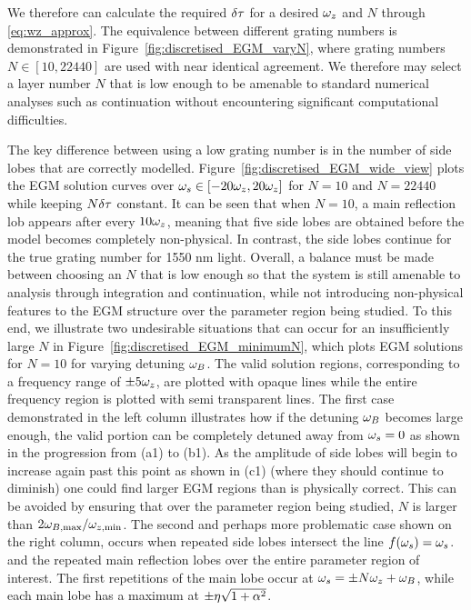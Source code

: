 %
We therefore can calculate the required $\delta \tau$ for a desired $\omega_z$ and $N$ through \eqref{eq:wz_approx}. 
The equivalence between different grating numbers is demonstrated in Figure~\ref{fig:discretised_EGM_varyN}, where grating numbers $N \in [10, 22440]$ are used with near identical agreement. 
We therefore may select a layer number $N$ that is low enough to be amenable to standard numerical analyses such as continuation without encountering significant computational difficulties.
%
\par
%
The key difference between using a low grating number is in the number of side lobes that are correctly modelled. 
Figure~\ref{fig:discretised_EGM_wide_view} plots the EGM solution curves over $\omega_s \in [-20\omega_z, 20\omega_z]$ for $N = 10$ and $N = 22440$ while keeping $N\delta \tau$ constant. 
It can be seen that when $N=10$, a main reflection lob appears after every $10\omega_z$, meaning that five side lobes are obtained before the model becomes completely non-physical. 
In contrast, the side lobes continue for the true grating number for 1550 nm light. 
Overall, a balance must be made between choosing an $N$ that is low enough so that the system is still amenable to analysis through integration and continuation, 
while not introducing non-physical features to the EGM structure over the parameter region being studied. 
To this end, we illustrate two undesirable situations that can occur for an insufficiently large $N$ in Figure~\ref{fig:discretised_EGM_minimumN}, which plots EGM solutions for $N=10$ for varying detuning $\omega_B$. 
The valid solution regions, corresponding to a frequency range of $\pm 5 \omega_z$, are plotted with opaque lines while the entire frequency region is plotted with semi transparent lines. 
The first case demonstrated in the left column illustrates how if the detuning $\omega_B$ becomes large enough, the valid portion can be completely detuned away from $\omega_s=0$ as shown in the progression from (a1) to (b1). 
As the amplitude of side lobes will begin to increase again past this point as shown in (c1) (where they should continue to diminish) one could find larger EGM regions than is physically correct. 
This can be avoided by ensuring that over the parameter region being studied, $N$ is larger than $2{\omega}_{B, \max}/{\omega}_{z,\min}$. 
The second and perhaps more problematic case shown on the right column, occurs when repeated side lobes intersect the line $f(\omega_s) = \omega_s$. 
and the repeated main reflection lobes over the entire parameter region of interest. The first repetitions of the main lobe occur at $\omega_s = \pm N \omega_z + \omega_B$, while each main lobe has a maximum at $\pm \eta \sqrt{1+\alpha^2}$. 
